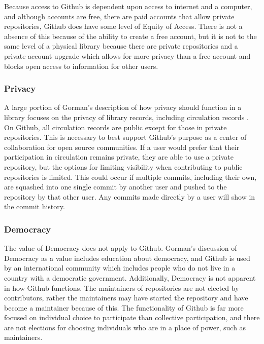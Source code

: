 Because access to Github is dependent upon access to internet and a computer, and although accounts are free, there are paid accounts that allow private repositories, Github does have some level of Equity of Access. There is not a absence of this because of the ability to create a free account, but it is not to the same level of a physical library because there are private repositories and a private account upgrade which allows for more privacy than a free account and blocks open access to information for other users. 

\subsubsection{Privacy} 

A large portion of Gorman's description of how privacy should function in a library focuses on the privacy of library records, including circulation records \cite{gorman2000values}. On Github, all circulation records are public except for those in private repositories. This is necessary to best support Github's purpose as a center of collaboration for open source communities. If a user would prefer that their participation in circulation remains private, they are able to use a private repository, but the options for limiting visibility when contributing to public repositories is limited. This could occur if multiple commits, including their own, are squashed into one single commit by another user and pushed to the repository by that other user. Any commits made directly by a user will show in the commit history. 

\subsubsection{Democracy}

The value of Democracy does not apply to Github. Gorman's discussion of Democracy as a value includes education about democracy, and Github is used by an international community which includes people who do not live in a country with a democratic government. Additionally, Democracy is not apparent in how Github functions. The maintainers of repositories are not elected by contributors, rather the maintainers may have started the repository and have become a maintainer because of this. The functionality of Github is far more focused on individual choice to participate than collective participation, and there are not elections for choosing individuals who are in a place of power, such as maintainers. 

